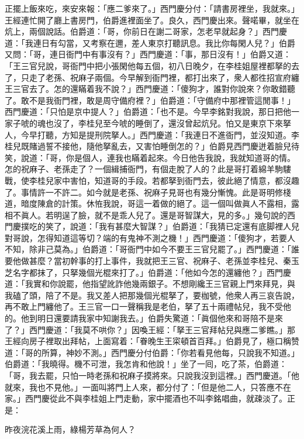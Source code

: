 正擺上飯來吃，來安來報：「應二爹來了。」西門慶分付：「請書房裡坐，我就來。」王經連忙開了廳上書房門，伯爵進裡面坐了。良久，西門慶出來。聲喏畢，就坐在炕上，兩個說話。伯爵道：「哥，你前日在謝二哥家，怎老早就起身？」西門慶道：「我連日有勾當，又考察在邇，差人東京打聽訊息。我比你每閑人兒？」伯爵又問：「哥，連日衙門中有事沒有？」西門慶道：「事，那日沒有！」伯爵又道：「王三官兒說，哥衙門中把小張閑他每五個，初八日晚夕，在李桂姐屋裡都拏的去了，只走了老孫、祝麻子兩個。今早解到衙門裡，都打出來了，衆人都徃招宣府纏王三官去了。怎的還瞞着我不說？」西門慶道：「傻狗才，誰對你說來？你敢錯聽了。敢不是我衙門裡，敢是周守備府裡？」{}伯爵道：「守備府中那裡管這閒事！」西門慶道：「只怕是京中提人？」伯爵道：「也不是。今早李銘對我說，那日把他一家子唬的魂也沒了，李桂兒至今唬的睡倒了，還沒曾起炕兒。怕又是東京下來拏人，今早打聽，方知是提刑院拏人。」西門慶道：「我連日不進衙門，並沒知道。李桂兒既賭過誓不接他，隨他拏亂去，又害怕睡倒怎的？」伯爵見西門慶迸着臉兒待笑，說道：「哥，你是個人，連我也瞞着起來。今日他告我說，我就知道哥的情。怎的祝麻子、老孫走了？一個緝捕衙門，有個走脫了人的？此是哥打着綿羊駒䮫戰，使李桂兒家中害怕，知道哥的手段。若都拏到衙門去，彼此絕了情意，都沒趣了。事情許一不許二。如今就是老孫、祝麻子見哥也有幾分慚愧。此是哥明修棧道，暗度陳倉的計策。休恠我說，哥這一着做的絕了。這一個叫做眞人不露相，露相不眞人。若明逞了臉，就不是乖人兒了。還是哥智謀大，見的多。」{}幾句說的西門慶撲吃的笑了，說道：「我有甚麼大智謀？」伯爵道：「我猜已定還有底脚裡人兒對哥說，怎得知道這等切？端的有鬼神不測之機！」西門慶道：「傻狗才，若要人不知，除非己莫為。」伯爵道：「哥衙門中如今不要王三官兒罷了。」西門慶道：「誰要他做甚麼？當初幹事的打上事件，我就把王三官、祝麻子、老孫並李桂兒、秦玉芝名字都抹了，只拏幾個光棍來打了。」伯爵道：「他如今怎的還纏他？」西門慶道：「我實和你說罷，他指望訛詐他幾兩銀子。不想剛纔王三官親上門來拜見，與我磕了頭，陪了不是。我又差人把那幾個光棍拏了，要枷號，他衆人再三哀告說，再不敢上門纏他了。王三官一口一聲稱我是老伯，{}拏了五十兩禮帖兒，我不受他的。他到明日還要請我家中知謝我去。」伯爵失驚道：「眞個他來和哥陪不是來了？」西門慶道：「我莫不哄你？」因喚王經：「拏王三官拜帖兒與應二爹瞧。」那王經向房子裡取出拜帖，上面寫着：「眷晚生王寀頓首百拜。」伯爵見了，極口稱赞道：「哥的所算，神妙不測。」西門慶分付伯爵：「你若看見他每，只說我不知道。」伯爵道：「我曉得。機不可泄，我怎肯和他說！」坐了一囘，吃了茶，伯爵道：「哥，我去罷，只怕一時老孫和祝麻子摸將來。只說我沒到這裡。」西門慶道。「他就來，我也不見他。」{}一面叫將門上人來，都分付了：「但是他二人，只答應不在家。」西門慶從此不與李桂姐上門走動，家中擺酒也不叫李銘唱曲，就疎淡了。正是：

\begin{myquote} 
昨夜浣花溪上雨，綠楊芳草為何人？
\end{myquote} 

